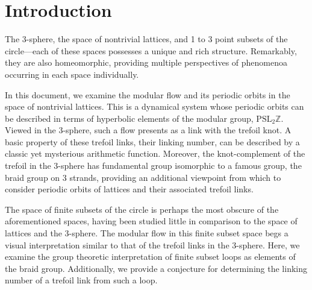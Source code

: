 \documentclass[12pt,twoside]{reedthesis}
\title{}
\author{}
\date{}
\theoremstyle{definition}
\newcommand{\Z}{\mathbb{Z}}
\newcommand{\PSLZ}{\mathrm{PSL}_2{\Z}}
\begin{document}
\setlength{\abovedisplayshortskip}{1em}
\setlength{\belowdisplayshortskip}{1em}
\setlength{\abovedisplayskip}{1em}
\setlength{\belowdisplayskip}{1em}

\maketitle
\frontmatter
\pagestyle{empty}


\setlength{\parskip}{0.2em}
\tableofcontents
\setlength{\parskip}{1em}


\mainmatter
\pagestyle{fancyplain}

\chapter*{Introduction}

The 3-sphere, the space of nontrivial lattices, and 1 to 3 point subsets of the circle---each of these spaces possesses a unique and rich structure.
Remarkably, they are also homeomorphic, providing multiple perspectives of phenomenoa occurring in each space individually.

In this document, we examine the modular flow and its periodic orbits in the space of nontrivial lattices.
This is a dynamical system whose periodic orbits can be described in terms of hyperbolic elements of the modular group, $\PSLZ$.
Viewed in the 3-sphere, such a flow presents as a link with the trefoil knot.
A basic property of these trefoil links, their linking number, can be described by a classic yet mysterious arithmetic function.
Moreover, the knot-complement of the trefoil in the 3-sphere has fundamental group isomorphic to a famous group, the braid group on 3 strands, providing an additional viewpoint from which to consider periodic orbits of lattices and their associated trefoil links.

The space of finite subsets of the circle is perhaps the most obscure of the aforementioned spaces, having been studied little in comparison to the space of lattices and the 3-sphere.
The modular flow in this finite subset space begs a visual interpretation similar to that of the trefoil links in the 3-sphere.
Here, we examine the group theoretic interpretation of finite subset loops as elements of the braid group.
Additionally, we provide a conjecture for determining the linking number of a trefoil link from such a loop.
\end{document}
